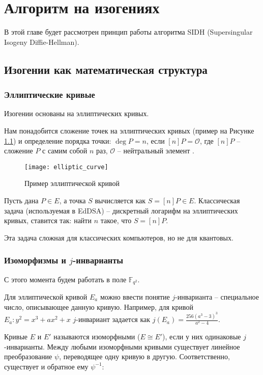 \chapter{Алгоритм на изогениях}
\label{ch:isogenies}

В этой главе будет рассмотрен принцип работы алгоритма SIDH (Supersingular Isogeny Diffie-Hellman).

\section{Изогении как математическая структура}

\subsection{Эллиптические кривые}

Изогении основаны на эллиптических кривых.

Нам понадобится сложение точек на эллиптических кривых (пример на Рисунке \ref{fig:elliptic_curve}) и определение порядка точки: $\deg P = n$, если $[n]P = \mathcal{O}$, где $[n]P$ -- сложение $P$ с самим собой $n$ раз, $\mathcal{O}$ -- нейтральный элемент .

\begin{figure}[ht]
	\centering
	\texttt{[image: elliptic\_curve]}
	\caption{Пример эллиптической кривой}
	\label{fig:elliptic_curve}
\end{figure}

Пусть дана $P \in E$, а точка $S$ вычисляется как $S = [n] P \in E$. 
Классическая задача (используемая в EdDSA) -- дискретный логарифм на эллиптических кривых, ставится так: найти $n$ такое, что $S = [n] P$.

Эта задача сложная для классических компьютеров, но не для квантовых.

\subsection{Изоморфизмы и $j$-инварианты}

С этого момента будем работать в поле $\mathds{F}_{q^2}.$

Для эллиптической кривой $E_a$ можно ввести понятие $j$-инварианта -- специальное число, описывающее данную кривую. Например, для кривой $E_a: y^2 = x^3 + ax^2 + x$ $j$-инвариант задается как $j(E_a) = \frac{256(a^3-3)^3}{a^2-4}$.

Кривые $E$ и $E'$ называются изоморфными ($E \cong E'$), если у них одинаковые $j$-инварианты. Между любыми изоморфными кривыми существует линейное преобразование $\psi$, переводящее одну кривую в другую. Соответственно, существует и обратное ему $\psi^{-1}$:

